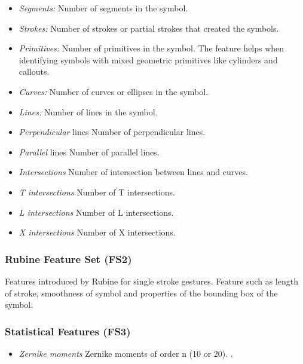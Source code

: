 \documentclass[preprint,10pt,5p,twocolumn]{elsarticle}
\begin{document}
 \begin{itemize}
	 \item \emph{Segments:} Number of segments in the symbol.
	 \item \emph{Strokes:} Number of strokes or partial strokes that created the symbols.  
		\item  \emph{Primitives:} Number of primitives in the symbol. The feature helps when identifying             symbols with mixed geometric primitives like cylinders and callouts.  
		\item \emph{Curves:} Number of curves or ellipses in the symbol. 
		\item \emph{Lines:} Number of lines in the symbol. 
		\item \emph{Perpendicular} lines Number of perpendicular lines. 
		\item \emph{Parallel} lines Number of parallel lines. 
		\item \emph{Intersections} Number of intersection between lines and curves. 
		\item \emph{T intersections} Number of T intersections. 
		\item \emph{L intersections} Number of L intersections. 
		\item \emph{X intersections} Number of X intersections.
	
\end{itemize}
\subsubsection{Rubine Feature Set (FS2)}
  Features introduced by Rubine\cite{gestureexample12} for single stroke gestures. Feature such as length of stroke, smoothness of symbol and properties of the bounding box of the symbol. 
  
\subsubsection{Statistical Features (FS3)}  
\begin{itemize}
	\item \emph{Zernike moments } Zernike moments of order n (10 or 20).  \cite{HeloiseBeautification}. 
\end{itemize}
\end{document}
